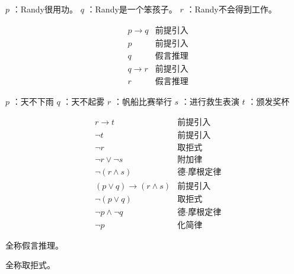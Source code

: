 {{        %
        \begin{practices}
            $p$ ：Randy很用功。
            $q$ ：Randy是一个笨孩子。
            $r$ ：Randy不会得到工作。

            \begin{align*}
                &p \rightarrow q &\text{前提引入} \\
                &p &\text{前提引入} \\
                &q &\text{假言推理} \\
                &q \rightarrow r &\text{前提引入} \\
                &r &\text{假言推理}
            \end{align*}
        \end{practices}

        \begin{practices}
            $p$ ：天不下雨
            $q$ ：天不起雾
            $r$ ：帆船比赛举行
            $s$ ：进行救生表演
            $t$ ：颁发奖杯

            \begin{align*}
                &r \rightarrow t &\text{前提引入} \\
                &\neg t &\text{前提引入} \\
                &\neg r &\text{取拒式} \\
                &\neg r \vee \neg s &\text{附加律} \\
                &\neg (r \wedge s) &\text{德·摩根定律} \\
                &(p \vee q) \rightarrow (r \wedge s) &\text{前提引入} \\
                &\neg (p \vee q) &\text{取拒式} \\
                &\neg p \wedge \neg q &\text{德·摩根定律} \\
                &\neg p &\text{化简律}
            \end{align*}
        \end{practices}

        \begin{practices}
            全称假言推理。
        \end{practices}

        \begin{practices}
            全称取拒式。
        \end{practices}

}}
